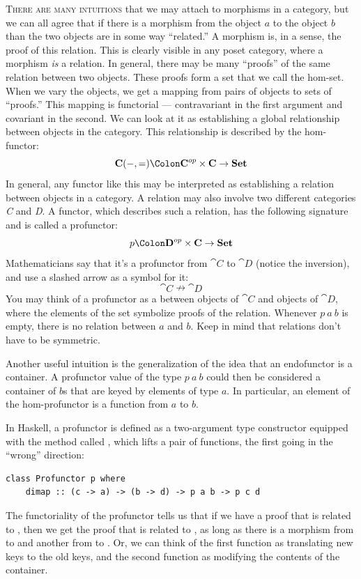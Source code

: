 \lettrine[lhang=0.17]{T}{here are many intuitions} that we may attach to morphisms in a category,
but we can all agree that if there is a morphism from the object
$a$ to the object $b$ than the two objects are in some way
``related.'' A morphism is, in a sense, the proof of this relation. This
is clearly visible in any poset category, where a morphism \emph{is} a
relation. In general, there may be many ``proofs'' of the same relation
between two objects. These proofs form a set that we call the hom-set.
When we vary the objects, we get a mapping from pairs of objects to sets
of ``proofs.'' This mapping is functorial --- contravariant in the first
argument and covariant in the second. We can look at it as establishing
a global relationship between objects in the category. This relationship
is described by the hom-functor:
\[\cat{C}(-, =) \Colon \cat{C}^{op}\times{}\cat{C} \to \Set\]
In general, any functor like this may be interpreted as establishing a
relation between objects in a category. A relation may also involve two
different categories \emph{C} and \emph{D}. A functor, which describes
such a relation, has the following signature and is called a profunctor:
\[p \Colon \cat{D}^{op}\times{}\cat{C} \to \Set\]
Mathematicians say that it's a profunctor from $\cat{C}$ to $\cat{D}$
(notice the inversion), and use a slashed arrow as a symbol for it:
\[\cat{C} \nrightarrow \cat{D}\]
You may think of a profunctor as a 
between objects of $\cat{C}$ and objects of $\cat{D}$, where the elements
of the set symbolize proofs of the relation. Whenever $p\ a\ b$
is empty, there is no relation between $a$ and $b$. Keep
in mind that relations don't have to be symmetric.

Another useful intuition is the generalization of the idea that an
endofunctor is a container. A profunctor value of the type
$p\ a\ b$ could then be considered a container of $b$s
that are keyed by elements of type $a$. In particular, an element
of the hom-profunctor is a function from $a$ to $b$.

In Haskell, a profunctor is defined as a two-argument type constructor
 equipped with the method called , which lifts a
pair of functions, the first going in the ``wrong'' direction:

\begin{Verbatim}
class Profunctor p where
    dimap :: (c -> a) -> (b -> d) -> p a b -> p c d
\end{Verbatim}
The functoriality of the profunctor tells us that if we have a proof
that  is related to , then we get the proof that
 is related to , as long as there is a morphism from
 to  and another from  to . Or,
we can think of the first function as translating new keys to the old
keys, and the second function as modifying the contents of the
container.

